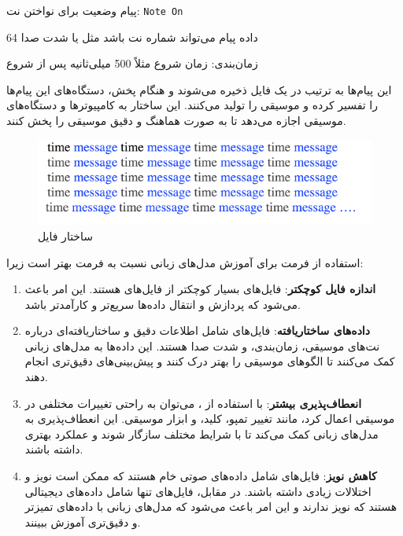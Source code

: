 \begin{example}[]
      \centering
      \label{example:}
      پیام وضعیت برای نواختن نت: \texttt{Note On}

      داده پیام می‌تواند شماره نت باشد مثل   یا شدت صدا 64

      زمان‌بندی: زمان شروع مثلاً 500 میلی‌ثانیه پس از شروع

      این پیام‌ها به ترتیب در یک فایل  ذخیره می‌شوند و هنگام پخش، دستگاه‌های  این پیام‌ها را تفسیر کرده و
      موسیقی را تولید می‌کنند. این ساختار به کامپیوترها و دستگاه‌های موسیقی اجازه می‌دهد تا به صورت هماهنگ و دقیق موسیقی را پخش کنند.

\end{example}


\begin{figure}[!htb]
      \centering
      \includegraphics[scale=1]{Figures/Screenshot 2024-08-29 021655.png}
      \caption{ساختار فایل 
      }
      \label{Fig:MIDI}
\end{figure}

استفاده از فرمت  برای آموزش مدل‌های زبانی نسبت به فرمت  بهتر است زیرا:

\begin{enumerate}
      \def\labelenumi{\arabic{enumi}.}
      \item
            \textbf{اندازه فایل کوچکتر}: فایل‌های  بسیار کوچکتر از فایل‌های 
            هستند. این امر باعث می‌شود که پردازش و انتقال داده‌ها سریع‌تر و کارآمدتر
            باشد.
      \item
            \textbf{داده‌های ساختاریافته}: فایل‌های  شامل اطلاعات دقیق و
            ساختاریافته‌ای درباره نت‌های موسیقی، زمان‌بندی، و شدت صدا هستند. این
            داده‌ها به مدل‌های زبانی کمک می‌کنند تا الگوهای موسیقی را بهتر درک کنند و
            پیش‌بینی‌های دقیق‌تری انجام دهند.
      \item
            \textbf{انعطاف‌پذیری بیشتر}: با استفاده از ، می‌توان به راحتی
            تغییرات مختلفی در موسیقی اعمال کرد، مانند تغییر تمپو، کلید، و ابزار
            موسیقی. این انعطاف‌پذیری به مدل‌های زبانی کمک می‌کند تا با شرایط مختلف
            سازگار شوند و عملکرد بهتری داشته باشند.
      \item
            \textbf{کاهش نویز}: فایل‌های  شامل داده‌های صوتی خام هستند که ممکن
            است نویز و اختلالات زیادی داشته باشند. در مقابل، فایل‌های  تنها
            شامل داده‌های دیجیتالی هستند که نویز ندارند و این امر باعث می‌شود که
            مدل‌های زبانی با داده‌های تمیزتر و دقیق‌تری آموزش ببینند.
\end{enumerate}


